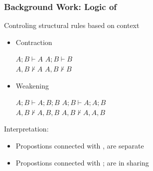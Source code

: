\begin{frame}[c]
  \frametitle{Background Work: Logic of \BI{}}
  \begin{center}
  Controling structural rules based on context

  \begin{itemize}

\item Contraction
  \begin{center}
   $A;B \vdash A$ \qquad $A;B \vdash B$\\
   $A,B \not\vdash A$ \qquad $A,B \not\vdash B$
 \end{center}
 \item Weakening
  \begin{center}
   $A;B \vdash A;B;B$ \qquad $A;B \vdash A;A;B$\\
   $A,B \not\vdash A,B,B$ \qquad $A,B \not\vdash A,A,B$
 \end{center}
\end{itemize}
  Interpretation:
  \begin{itemize}
  \item Propostions connected with , are separate
  \item Propostions connected with ; are in sharing
\end{itemize}
\end{center}

\end{frame}

